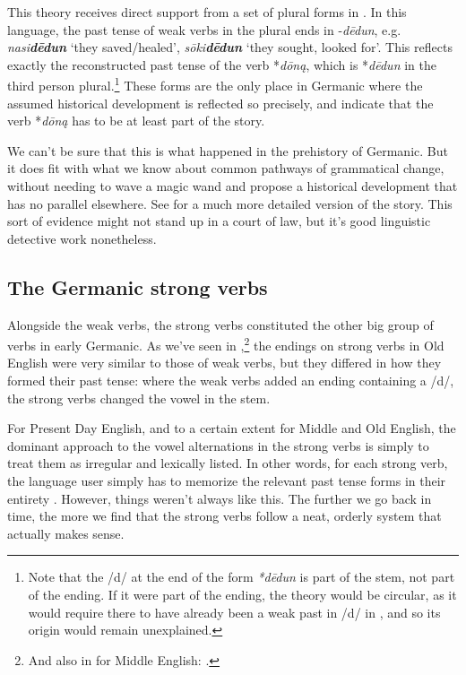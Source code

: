 This theory receives direct support from a set of plural forms in . In this language, the past tense of weak verbs in the plural ends in -\emph{dēdun}, e.g. \emph{nasi\textbf{dēdun}} `they saved/healed', \emph{sōki\textbf{dēdun}} `they sought, looked for'. This reflects exactly the reconstructed  past tense of the verb *\emph{dōną}, which is *\emph{dēdun} in the third person plural.\footnote{Note that the /d/ at the end of the form \emph{*dēdun} is part of the stem, not part of the ending. If it were part of the ending, the theory would be circular, as it would require there to have already been a weak past in /d/ in , and so its origin would remain unexplained.} These forms are the only place in Germanic where the assumed historical development is reflected so precisely, and indicate that the verb *\emph{dōną} has to be at least part of the story.

We can't be sure that this is what happened in the prehistory of Germanic. But it does fit with what we know about common pathways of grammatical change, without needing to wave a magic wand and propose a historical development that has no parallel elsewhere. See \citet[191--192]{Ringe2017} for a much more detailed version of the story. This sort of evidence might not stand up in a court of law, but it's good linguistic detective work nonetheless.

\subsection{The Germanic strong verbs}\label{prehistory-strong}
Alongside the weak verbs, the strong verbs constituted the other big group of verbs in early Germanic. As we've seen in ,\footnote{And also in  for Middle English: .} the endings on strong verbs in Old English were very similar to those of weak verbs, but they differed in how they formed their past tense: where the weak verbs added an ending containing a /d/, the strong verbs changed the vowel in the stem.

For Present Day English, and to a certain extent for Middle and Old English, the dominant approach to the vowel alternations in the strong verbs is simply to treat them as irregular and lexically listed. In other words, for each strong verb, the language user simply has to memorize the relevant past tense forms in their entirety \citep{Pinker1999}. However, things weren't always like this. The further we go back in time, the more we find that the strong verbs follow a neat, orderly system that actually makes sense.

